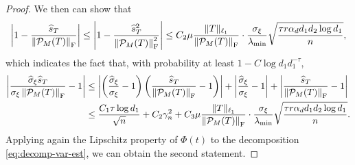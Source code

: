 \documentclass[12pt]{article}
\newcommand{\tF}{{\rm F}}
\newcommand{\abs}[1]{\left\lvert#1\right\rvert}
\newcommand{\norm}[1]{\left\lVert#1\right\rVert}
\newcommand{\cP}{\mathcal{P}}
\theoremstyle{plain}
\begin{document}
\begin{proof}
We then can show that 
\begin{equation}\label{eq:sT-diff}
    \begin{aligned}\left| 1- \frac{\widehat{s}_T }{\norm{\cP_M(T)}_\tF}\right| \le \abs{1- \frac{\widehat{s}_T^2 }{\norm{\cP_M(T)}_\tF^2}} \le 
         C_2 \mu \frac{\|T\|_{\ell_1}}{\norm{\cP_M(T)}_{\tF} } \cdot \frac{\sigma_{\xi}}{\lambda_{\min}} \sqrt{\frac{\tau r \alpha_d d_1 d_2 \log d_1}{n}},
    \end{aligned}
\end{equation}
which indicates the fact that, with probability at least $1-C\log d_1 d_1^{-\tau} $,
\begin{equation*}
    \begin{aligned}
         \abs{\frac{ \widehat{\sigma}_{\xi}  \widehat{s}_T  }{\sigma_\xi \norm{\cP_M(T)}_\tF} -1}&\le \abs{\left(\frac{ \widehat{\sigma}_{\xi}    }{\sigma_\xi }- 1\right) \left(\frac{ \widehat{s}_T  }{ \norm{\cP_M(T)}_\tF}-1\right) } + \abs{\frac{ \widehat{\sigma}_{\xi}    }{\sigma_\xi }- 1}+ \abs{\frac{ \widehat{s}_T  }{ \norm{\cP_M(T)}_\tF}-1} \\
         &\le \frac{C_1 \tau \log d_1}{\sqrt{n}}+C_2 \gamma_n^2 + C_3 \mu \frac{\|T\|_{\ell_1}}{\norm{\cP_M(T)}_{\tF} } \cdot \frac{\sigma_{\xi}}{\lambda_{\min}} \sqrt{\frac{\tau r \alpha_d d_1 d_2 \log d_1}{n}}.
    \end{aligned}
\end{equation*}
Applying again the Lipschitz property of $\Phi (t)$ to the decomposition \eqref{eq:decomp-var-est}, we can obtain the second statement.


\end{proof}
\end{document}
